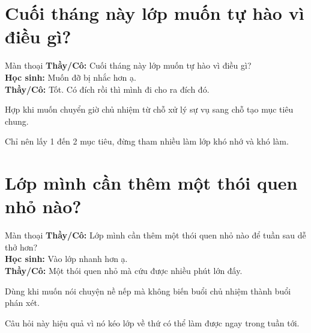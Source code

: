 \section{Cuối tháng này lớp muốn tự hào vì điều gì?}
\begin{manthoai}{Màn thoại}
\textbf{Thầy/Cô:} Cuối tháng này lớp muốn tự hào vì điều gì?\\
\textbf{Học sinh:} Muốn đỡ bị nhắc hơn ạ.\\
\textbf{Thầy/Cô:} Tốt. Có đích rồi thì mình đi cho ra đích đó.
\end{manthoai}
\begin{dungkhinào}
Hợp khi muốn chuyển giờ chủ nhiệm từ chỗ xử lý sự vụ sang chỗ tạo mục tiêu chung.
\end{dungkhinào}
\begin{nhipthem}
Chỉ nên lấy 1 đến 2 mục tiêu, đừng tham nhiều làm lớp khó nhớ và khó làm.
\end{nhipthem}
\ngancach

\section{Lớp mình cần thêm một thói quen nhỏ nào?}
\begin{manthoai}{Màn thoại}
\textbf{Thầy/Cô:} Lớp mình cần thêm một thói quen nhỏ nào để tuần sau dễ thở hơn?\\
\textbf{Học sinh:} Vào lớp nhanh hơn ạ.\\
\textbf{Thầy/Cô:} Một thói quen nhỏ mà cứu được nhiều phút lớn đấy.
\end{manthoai}
\begin{dungkhinào}
Dùng khi muốn nói chuyện nề nếp mà không biến buổi chủ nhiệm thành buổi phán xét.
\end{dungkhinào}
\begin{nhipthem}
Câu hỏi này hiệu quả vì nó kéo lớp về thứ có thể làm được ngay trong tuần tới.
\end{nhipthem}

